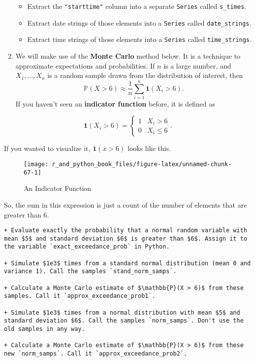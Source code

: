 \documentclass[12pt,krantz2]{krantz}
\begin{document}
\begin{enumerate}
  \begin{itemize}
  \item
    Extract the \texttt{"starttime"} column into a separate \texttt{Series} called \texttt{s\_times}.
  \item
    Extract date strings of those elements into a \texttt{Series} called \texttt{date\_strings}.
  \item
    Extract time strings of those elements into a \texttt{Series} called \texttt{time\_strings}.
  \end{itemize}
\item
  We will make use of the \textbf{Monte Carlo} method below. It is a technique to approximate expectations and probabilities. If \(n\) is a large number, and \(X_1, \ldots, X_n\) is a random sample drawn from the distribution of interest, then
  \begin{equation} 
  \mathbb{P}(X > 6) \approx \frac{1}{n}\sum_{i=1}^n \mathbf{1}(X_i > 6).
  \end{equation}
  If you haven't seen an \textbf{indicator function} before, it is defined as
\end{enumerate}

\begin{equation} 
\mathbf{1}(X_i > 6)
=
\begin{cases}
1 & X_i > 6 \\
0 & X_i \le 6
\end{cases}.
\end{equation}

If you wanted to visualize it, \(\mathbf{1}(x > 6)\) looks like this.

\begin{figure}

{\centering \texttt{[image: r\_and\_python\_book\_files/figure-latex/unnamed-chunk-67-1]} 

}

\caption{An Indicator Function}\label{fig:unnamed-chunk-67}
\end{figure}

So, the sum in this expression is just a count of the number of elements that are greater than \(6\).

\begin{verbatim}
+ Evaluate exactly the probability that a normal random variable with mean $5$ and standard deviation $6$ is greater than $6$. Assign it to the variable `exact_exceedance_prob` in Python.

+ Simulate $1e3$ times from a standard normal distribution (mean 0 and variance 1). Call the samples `stand_norm_samps`.

+ Calculate a Monte Carlo estimate of $\mathbb{P}(X > 6)$ from these samples. Call it `approx_exceedance_prob1`.

+ Simulate $1e3$ times from a normal distribution with mean $5$ and standard deviation $6$. Call the samples `norm_samps`. Don't use the old samples in any way.

+ Calculate a Monte Carlo estimate of $\mathbb{P}(X > 6)$ from these new `norm_samps`. Call it `approx_exceedance_prob2`.
\end{verbatim}
\end{document}
